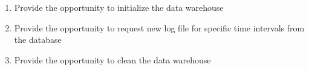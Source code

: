 \begin{enumerate}[resume*=func]
   
  \item Provide the opportunity to initialize the \gls{data warehouse} \label{f27}
   
  \item Provide the opportunity to request new \gls{log file} for specific time intervals
  	from the \gls{database} \label{f28}
  
  \item Provide the opportunity to clean the \gls{data warehouse} \label{f29}
   
\end{enumerate}


